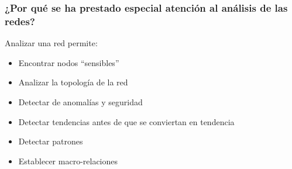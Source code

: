 \documentclass[
10pt, %
aspectratio=169, %
]{beamer}
\begin{document}
	\begin{frame}
		
		\frametitle{¿Por qué se ha prestado especial atención al análisis de las redes?}
		
		Analizar una red permite:
		\begin{itemize}
			
			\item Encontrar nodos ``sensibles'' \\[1mm]
			
			\item Analizar la topología de la red \\[1mm]
			
			\item Detectar de anomalías y seguridad \\[1mm]
			
			\item Detectar tendencias antes de que se conviertan en tendencia \\[1mm]
			
			\item Detectar patrones 
			
			\item Establecer macro-relaciones 
			
		\end{itemize}
		
	\end{frame}
	
\end{document}
